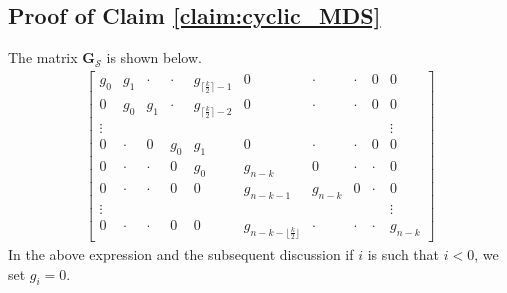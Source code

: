 \documentclass[journal,twocolumn]{IEEEtran}
\theoremstyle{definition}
\newcommand{\calS}{\mathcal{S}}
\newcommand{\bfG}{\mathbf{G}}
\begin{document}
\subsection*{Proof of Claim \ref{claim:cyclic_MDS}}
The matrix  $\bfG_\calS$ is shown below.
\begin{align*}
\begin{bmatrix}
g_0&g_1&\cdot&\cdot&g_{\lceil\frac{k}{2}\rceil-1}&0&\cdot&\cdot&0&0\\
0&g_0&g_1&\cdot&g_{\lceil\frac{k}{2}\rceil-2}&0&\cdot&\cdot&0&0\\
\vdots&&&&&&&&&\vdots\\
0&\cdot&0&g_0&g_1&0&\cdot&\cdot&0&0\\
0&\cdot&\cdot&0&g_0&g_{n-k}&0&\cdot&\cdot&0\\
0&\cdot&\cdot&0&0&g_{n-k-1}&g_{n-k}&0&\cdot&0\\
\vdots&&&&&&&&&\vdots\\
0&\cdot&\cdot&0&0&g_{n-k-\lfloor \frac{k}{2}\rfloor}&\cdot&\cdot&\cdot&g_{n-k}
\end{bmatrix}
\end{align*}
In the above expression and the subsequent discussion if $i$ is such that $i < 0$, we set $g_i=0$.
\end{document}
